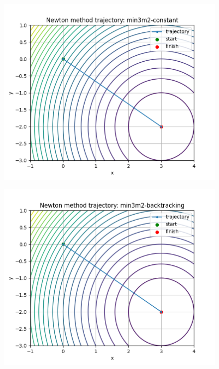 \documentclass{article}
\begin{document}
\begin{figure}
    \centering
    \includegraphics[width=1\linewidth]{min3m2-constant.png}
    \label{fig:enter-label}
\end{figure}
\begin{figure}
    \centering
    \includegraphics[width=1\linewidth]{min3m2-backtracking.png}
    \label{fig:enter-label}
\end{figure}
\end{document}
